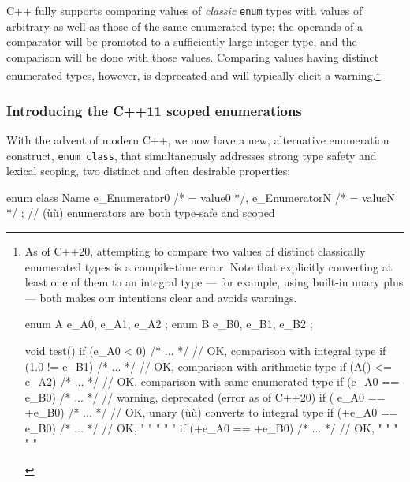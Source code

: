C++ fully supports comparing values of \emph{classic} \lstinline!enum!
types with values of arbitrary  as well as those
of the same enumerated type; the operands of a comparator will be
promoted to a sufficiently large integer type, and the comparison will be
done with those values. Comparing values having distinct enumerated
types, however, is deprecated and will typically elicit a
warning.{\cprotect\footnote{As of C++20, attempting to compare two values of distinct classically enumerated
types is a compile-time error. Note that explicitly converting at least one of them to an
integral type --- for example, using built-in unary plus --- both
makes our intentions clear and avoids warnings.

\begin{emcppshiddenlisting}[emcppsbatch=e2]
    enum A { e_A0, e_A1, e_A2 };
    enum B { e_B0, e_B1, e_B2 };
\end{emcppshiddenlisting}
\begin{emcppslisting}[emcppsbatch=e2,style=footcode]
void test()
{
  if (e_A0 < 0)       { /* ... */ }  // OK, comparison with integral type
  if (1.0 != e_B1)    { /* ... */ }  // OK, comparison with arithmetic type
  if (A() <= e_A2)    { /* ... */ }  // OK, comparison with same enumerated type
  if (e_A0 == e_B0)   { /* ... */ }  // warning, deprecated (error as of C++20)
  if ( e_A0 == +e_B0) { /* ... */ }  // OK, unary (ù{\fncodeincomments{+}}ù) converts to integral type
  if (+e_A0 ==  e_B0) { /* ... */ }  // OK,   "        "     "     "      "
  if (+e_A0 == +e_B0) { /* ... */ }  // OK,   "        "     "     "      "
}
\end{emcppslisting}
      }}

\subsubsection[Introducing the C++11 scoped enumerations]{Introducing the C++11 scoped enumerations}\label{introducing-the-c++11-enum-class}

With the advent of modern C++, we now have a new, alternative
enumeration construct, \lstinline!enum!~\lstinline!class!, that simultaneously
addresses strong type safety and lexical scoping, two distinct and often
desirable properties:

\begin{emcppslisting}
enum class Name { e_Enumerator0 /* = value0 */, e_EnumeratorN /* = valueN */ };
    // (ù{}ù) enumerators are both type-safe and scoped
\end{emcppslisting}

